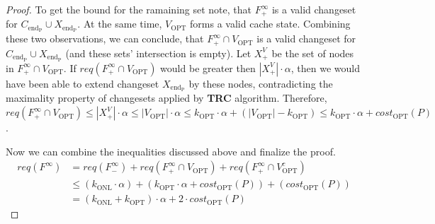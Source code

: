\begin{proof}
To get the bound for the ramaining set note, that $F^{\infty}_{+}$ is a valid
changeset for $C_{\mathrm{end_P}} \cup X_{\mathrm{end_P}}$. At the same time,
$V_{\mathrm{OPT}}$ forms a valid cache state. Combining these two observations,
we can conclude, that $F^{\infty}_{+} \cap V_{\mathrm{OPT}}$ is a valid
changeset for $C_{\mathrm{end_P}} \cup X_{\mathrm{end_P}}$ (and these sets'
intersection is empty). Let $X^{V}_{+}$ be the set of nodes in $F^{\infty}_{+}
\cap V_{\mathrm{OPT}}$. If $req(F^{\infty}_{+} \cap V_{\mathrm{OPT}})$ would be
greater then $|X^{V}_{+}| \cdot \alpha$, then we would have been able to extend
changeset $X_{\mathrm{end_P}}$ by these nodes, contradicting the maximality
property of changesets applied by \textbf{TRC} algorithm.  Therefore,
$req(F^{\infty}_{+} \cap V_{\mathrm{OPT}}) \leq |X^{V}_{+}| \cdot \alpha \leq
|V_{\mathrm{OPT}}| \cdot \alpha \leq k_{\mathrm{OPT}} \cdot \alpha +
(|V_{\mathrm{OPT}}| - k_{\mathrm{OPT}}) \leq k_{\mathrm{OPT}} \cdot \alpha +
cost_{\mathrm{OPT}}(P)$.

Now we can combine the inequalities discussed above and finalize the proof.
\begin{equation*} \begin{split} req(F^{\infty}) & = req(F^{\infty}_{-}) +
req(F^{\infty}_{+} \cap V_{\mathrm{OPT}}) + req(F^{\infty}_{+} \cap
V_{\mathrm{OPT}}^c) \\ & \leq (k_{\mathrm{ONL}} \cdot \alpha) +
(k_{\mathrm{OPT}} \cdot \alpha + cost_{\mathrm{OPT}}(P)) +
(cost_{\mathrm{OPT}}(P)) \\ & = (k_{\mathrm{ONL}} + k_{\mathrm{OPT}}) \cdot
\alpha + 2 \cdot cost_{\mathrm{OPT}}(P) \end{split} \end{equation*} \end{proof}

